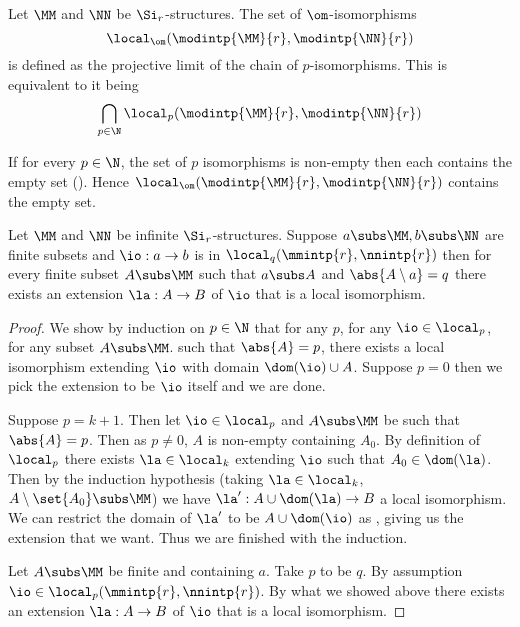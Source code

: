 \begin{dfn}[$\om$-isomorphism]
    Let $\MM$ and $\NN$ be $\Si_r$-structures.
    The set of $\om$-isomorphisms 
    \[\local_\om(\modintp{\MM}{r},\modintp{\NN}{r})\]
    is defined as the projective limit of the chain of $p$-isomorphisms.
    This is equivalent to it being 
    \[\bigcap_{p \in \N} \local_p(\modintp{\MM}{r},\modintp{\NN}{r})\]
\end{dfn}
\begin{rmk}
    If for every $p \in \N$, the set of $p$ isomorphisms is non-empty then 
    each contains the empty set 
    ().
    Hence
    $\local_\om(\modintp{\MM}{r},\modintp{\NN}{r})$ contains the empty set.
\end{rmk}

\begin{prop}
    Let $\MM$ and $\NN$ be infinite $\Si_r$-structures.
    Suppose $a \subs \MM, b \subs \NN$ are finite subsets
    and $\io : a \to b$ is in $\local_{q}(\mmintp{r},\nnintp{r})$ then 
    for every finite subset $A \subs \MM$ such that $a \subs A$
    and $\abs{A \setminus a} = q$
    there exists an extension $\la : A \to B$ of $\io$ 
    that is a local isomorphism.
\end{prop}
\begin{proof}
    We show by induction on $p \in \N$ that 
    for any $p$, for any $\io \in \local_p$, for any subset $A \subs \MM$.
    such that $\abs{A} = p$,
    there exists a local isomorphism extending $\io$ 
    with domain $\dom(\io) \cup A$.
    Suppose $p = 0$ then we pick the extension 
    to be $\io$ itself and we are done.

    Suppose $p = k + 1$.
    Then let $\io \in \local_p$ and $A \subs \MM$ be such that 
    $\abs{A} = p$.
    Then as $p \ne 0$, 
    $A$ is non-empty containing $A_0$.
    By definition of $\local_p$ there exists $\la \in \local_k$ 
    extending $\io$ such that $A_0 \in \dom(\la)$.
    Then by the induction hypothesis 
    (taking $\la \in \local_k$, 
    $A \setminus \set{A_0} \subs \MM$)
    we have $\la' : A \cup \dom(\la) \to B$ a local isomorphism.
    We can restrict the domain of $\la'$ 
    to be $A \cup \dom(\io)$ as 
    ,
    giving us the extension that we want.
    Thus we are finished with the induction.

    Let $A \subs \MM$ be finite and containing $a$.
    Take $p$ to be $q$.
    By assumption $\io \in \local_{p}(\mmintp{r},\nnintp{r})$.
    By what we showed above there exists an extension 
    $\la : A \to B$ of $\io$ 
    that is a local isomorphism.
\end{proof}

